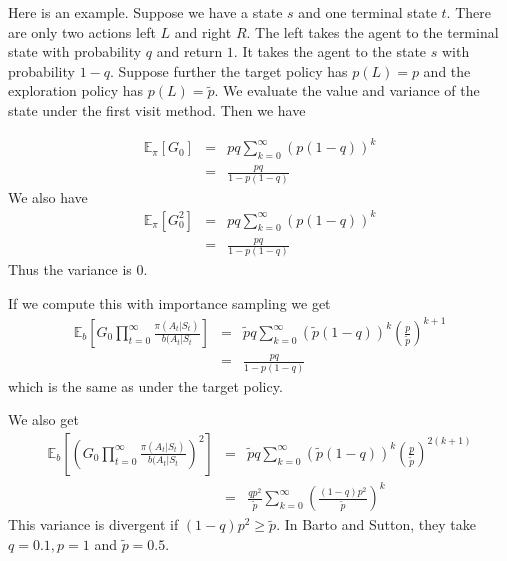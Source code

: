 \documentclass[11pt,a4paper]{article}
\newcommand\bea{\begin{eqnarray}}
\newcommand\eea{\end{eqnarray}}
\newcommand{\nn}{\nonumber \\}
\begin{document}
Here is an example. Suppose we have a state $s$ and one terminal state $t$. There are only two actions left $L$ and right $R$. The left takes the agent to the terminal state with probability $q$ and return $1$. It takes the agent to the state $s$ with probability $1-q$. Suppose further the target policy has $p(L)=p$ and the exploration policy has $p(L)=\tilde p$. We evaluate the value and variance of the state under the first visit method. Then we have

\bea
\mathbb E_\pi[G_0] &=& pq \sum_{k=0}^\infty (p (1-q))^k \nn
&=& \frac{pq}{1-p(1-q)}
\eea
We also have
\bea
\mathbb E_\pi[G_0^2] &=& pq \sum_{k=0}^\infty (p (1-q))^k \nn
&=& \frac{pq}{1-p(1-q)}
\eea
Thus the variance is 0.

If we compute this with importance sampling we get
\bea
\mathbb E_b[G_0 \prod_{t=0}^\infty \frac{\pi(A_t|S_t)}{b(A_t|S_t}] &=& \tilde pq \sum_{k=0}^\infty (\tilde p (1-q))^k \left( \frac{p}{\tilde p} \right)^{k+1} \nn
&=& \frac{pq}{1-p(1-q)}
\eea
which is the same as under the target policy.

We also get
\bea
\mathbb E_b[\left(G_0 \prod_{t=0}^\infty \frac{\pi(A_t|S_t)}{b(A_t|S_t}\right)^2] &=& \tilde pq \sum_{k=0}^\infty (\tilde p (1-q))^k \left( \frac{p}{\tilde p} \right)^{2(k+1)} \nn
&=& \frac{qp^2}{\tilde p} \sum_{k=0}^\infty \left( \frac{(1-q) p^2}{\tilde p}\right)^k
\eea
This variance is divergent if $(1-q)p^2 \ge \tilde p$. In Barto and Sutton, they take $q=0.1, p=1$ and $\tilde p=0.5$.
\end{document}
